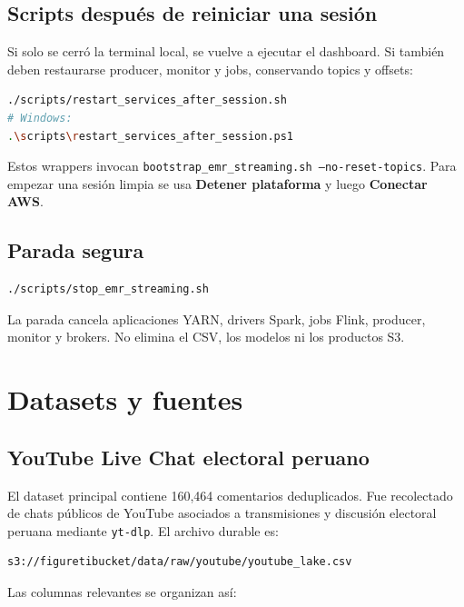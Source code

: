 \documentclass[11pt,a4paper,openany]{report}
\newcommand{\topic}[1]{\texttt{#1}}
\begin{document}
\section{Scripts después de reiniciar una sesión}

Si solo se cerró la terminal local, se vuelve a ejecutar el dashboard. Si también deben restaurarse producer, monitor y jobs, conservando topics y offsets:

\begin{lstlisting}[language=bash]
./scripts/restart_services_after_session.sh
# Windows:
.\scripts\restart_services_after_session.ps1
\end{lstlisting}

Estos wrappers invocan \topic{bootstrap\_emr\_streaming.sh --no-reset-topics}. Para empezar una sesión limpia se usa \textbf{Detener plataforma} y luego \textbf{Conectar AWS}.

\section{Parada segura}

\begin{lstlisting}[language=bash]
./scripts/stop_emr_streaming.sh
\end{lstlisting}

La parada cancela aplicaciones YARN, drivers Spark, jobs Flink, producer, monitor y brokers. No elimina el CSV, los modelos ni los productos S3.

\chapter{Datasets y fuentes}

\section{YouTube Live Chat electoral peruano}

El dataset principal contiene 160,464 comentarios deduplicados. Fue recolectado de chats públicos de YouTube asociados a transmisiones y discusión electoral peruana mediante \topic{yt-dlp}. El archivo durable es:

\begin{lstlisting}
s3://figuretibucket/data/raw/youtube/youtube_lake.csv
\end{lstlisting}

Las columnas relevantes se organizan así:
\end{document}

